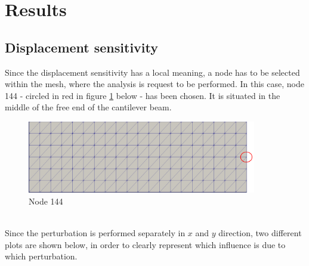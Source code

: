 
\section{Results}

\subsection{Displacement sensitivity}

Since the displacement sensitivity has a local meaning, a node has to be selected within the mesh, where the analysis is request to be performed. In this case, node 144 - circled in red in figure \ref{cantileverBeam:nodeOfInterest} below - has been chosen. It is situated in the middle of the free end of the cantilever beam. \\
\begin{figure}[ht]
\centering
  \includegraphics[width=100mm]{images/meshNodeOfInterest.png}
  \caption{Node 144}
  \label{cantileverBeam:nodeOfInterest}
\end{figure}\\
Since the perturbation is performed separately in $x$ and $y$ direction, two different plots are shown below, in order to clearly represent which influence is due to which perturbation. \\
